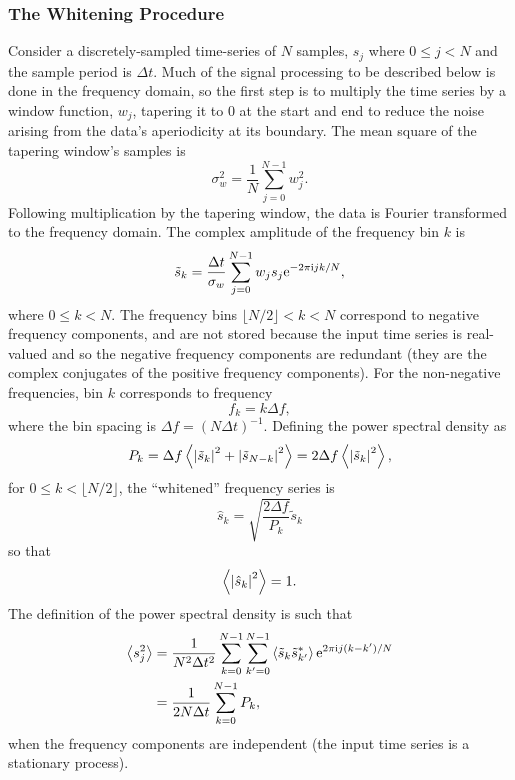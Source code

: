 \documentclass[10pt]{article}
\begin{document}
\subsubsection{The Whitening Procedure}


Consider a discretely-sampled time-series of \(N\) samples, \(s_j\) where
\(0 \leq j < N\) and the sample period is \(\Delta t\).  Much of the signal
processing to be described below is done in the frequency domain, so the
first step is to multiply the time series by a window function, \(w_{j}\),
tapering it to 0 at the start and end to reduce the noise arising from the
data's aperiodicity at its boundary.  The mean square of the tapering
window's samples is
\begin{equation}
\sigma_{w}^{2}
   = \frac{1}{N} \sum_{j = 0}^{N - 1} w_{j}^2.
\end{equation}
Following multiplication by the tapering window, the data is Fourier
transformed to the frequency domain.  The complex amplitude of the
frequency bin \(k\) is
\begin{equation}
\tilde{s}_{k}
   = \frac{\Delta t}{\sigma_{w}} \sum_{j = 0}^{N - 1} w_{j} s_{j} \mathrm{e}^{-2
   \pi \mathrm{i} j k / N},
\end{equation}
where \(0 \leq k < N\).  The frequency bins \(\lfloor N / 2 \rfloor < k <
N\) correspond to negative frequency components, and are not stored because
the input time series is real-valued and so the negative frequency
components are redundant (they are the complex conjugates of the positive
frequency components).  For the non-negative frequencies, bin \(k\)
corresponds to frequency
\begin{equation}
f_{k}
   = k \Delta f,
\end{equation}
where the bin spacing is \(\Delta f = (N \Delta t)^{-1}\).  Defining the
power spectral density as
\begin{equation}
P_{k}
   = \Delta f \left\langle\left|\tilde{s}_{k}\right|^{2} + \left|\tilde{s}_{N
   - k}\right|^{2}\right\rangle
   = 2 \Delta f \left\langle\left|\tilde{s}_{k}\right|^{2}\right\rangle,
\end{equation}
for \(0 \leq k < \lfloor N / 2 \rfloor\), the ``whitened'' frequency series
is
\begin{equation}
\hat{s}_{k}
   = \sqrt{\frac{2 \Delta f}{P_{k}}} \tilde{s}_{k}
\end{equation}
so that
\begin{equation}
\label{eqn3}
\left\langle\left|\hat{s}_{k}\right|^2\right\rangle
   = 1.
\end{equation}
The definition of the power spectral density is such that
\begin{align}
\left\langle s_{j}^{2}\right\rangle
   & = \frac{1}{N^{2} \Delta t^{2}} \sum_{k = 0}^{N - 1} \sum_{k' = 0}^{N -
   1} \left\langle\tilde{s}_{k} \tilde{s}^{*}_{k'}\right\rangle \mathrm{e}^{2 \pi \mathrm{i} j (k - k')
   / N}
   \\
   & = \frac{1}{2 N \Delta t} \sum_{k = 0}^{N - 1} P_{k},
\end{align}
when the frequency components are independent (the input time series is a
stationary process).
\end{document}
